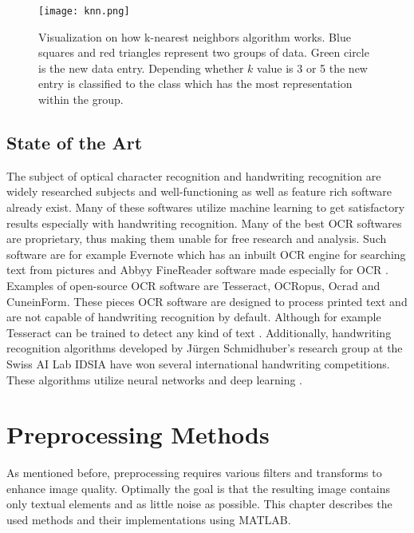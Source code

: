 \documentclass{article}
\begin{document}
          \begin{figure}[!ht]
            \centering
            \texttt{[image: knn.png]}
            \caption{Visualization on how k-nearest neighbors algorithm works. Blue squares
                      and red triangles represent two groups of data. Green circle is the new
                      data entry. Depending whether $k$ value is 3 or 5 the new entry is classified
                      to the class which has the most representation within the group.\label{fig:knn} }
          \end{figure}

    \subsection{State of the Art}
      The subject of optical character recognition and handwriting recognition are widely researched subjects and well-functioning as well as feature rich software already exist. Many of these softwares utilize machine learning to get satisfactory results especially with handwriting recognition. Many of the best OCR softwares are proprietary, thus making them unable for free research and analysis. Such software are for example Evernote which has an inbuilt OCR engine for searching text from pictures \cite{Kelly} and Abbyy FineReader software made especially for OCR \cite{ABBYY}. Examples of open-source OCR software are Tesseract\cite{Smith2007a}, OCRopus\cite{Breuel2007}, Ocrad\cite{FreeSoftwareFoundation2016} and CuneinForm\cite{CognitiveTechnologies2016}. These pieces OCR software are designed to process printed text and are not capable of handwriting recognition by default. Although for example Tesseract can be trained to detect any kind of text \cite{Smith2007a}. Additionally, handwriting recognition algorithms developed by J{\"u}rgen Schmidhuber's research group at the Swiss AI Lab IDSIA have won several international handwriting competitions. These algorithms utilize neural networks and deep learning \cite{Angelica}.

  \newpage
  \section{Preprocessing Methods}
  As mentioned before, preprocessing requires various filters and transforms to enhance image quality. Optimally the goal is that the resulting image contains only textual elements and as little noise as possible. This chapter describes the used methods and their implementations using MATLAB.
\end{document}
